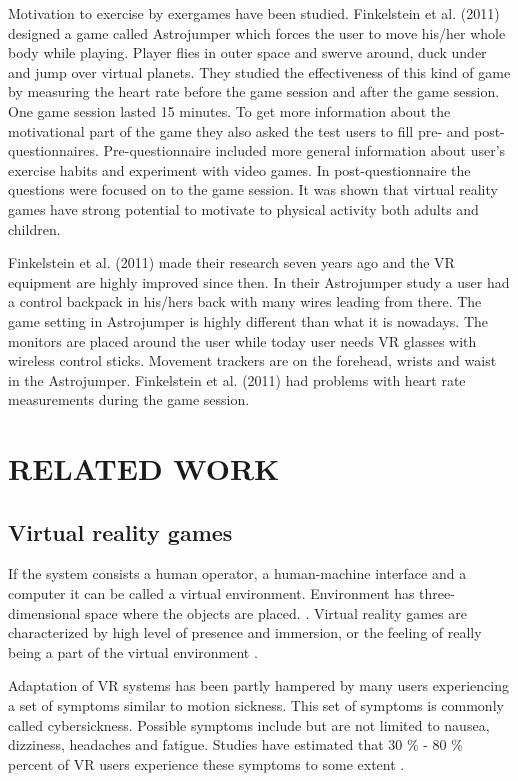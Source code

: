 \documentclass{sig-alternate-05-2015}
\begin{document}
Motivation to exercise by exergames have been studied. Finkelstein et al. 
(2011) designed a game called Astrojumper which forces the user to move 
his/her whole body while playing. Player flies in outer space and swerve 
around, duck under and jump over virtual planets. They studied the 
effectiveness of this kind of game by measuring the heart rate before the 
game session and after the game session. One game session lasted 15 minutes. 
To get more information about the motivational part of the game they also 
asked the test users to fill pre- and post-questionnaires. Pre-questionnaire 
included more general information about user’s exercise habits and experiment 
with video games. In post-questionnaire the questions were focused on to the 
game session. It was shown that virtual reality games have strong potential 
to motivate to physical activity both adults and children.

Finkelstein et al. (2011) made their research seven years ago and the VR 
equipment are highly improved since then. In their Astrojumper study a user 
had a control backpack in his/hers back with many wires leading from there. 
The game setting in Astrojumper is highly different than what it is nowadays. 
The monitors are placed around the user while today user needs VR glasses with 
wireless control sticks. Movement trackers are on the forehead, wrists and 
waist in the Astrojumper. Finkelstein et al. (2011) had problems with heart 
rate measurements during the game session.

\section{RELATED WORK}
\subsection{Virtual reality games}
If the system consists a human operator, a human-machine interface and 
a computer it can be called a virtual environment. Environment has 
three-dimensional space where the objects are placed. 
\cite{national1995virtual}. Virtual reality games are characterized by high 
level of presence and immersion, or the feeling of really being a part 
of the virtual environment \cite{steuer1992defining}.

Adaptation of VR systems has been partly hampered by many users 
experiencing a set of symptoms similar to motion sickness. This set 
of symptoms is commonly called cybersickness. Possible symptoms include 
but are not limited to nausea, dizziness, headaches and fatigue. 
Studies have estimated that 30 \% - 80 \% percent of VR users 
experience these symptoms to some extent \cite{rebenitsch2016review}.
\end{document}
